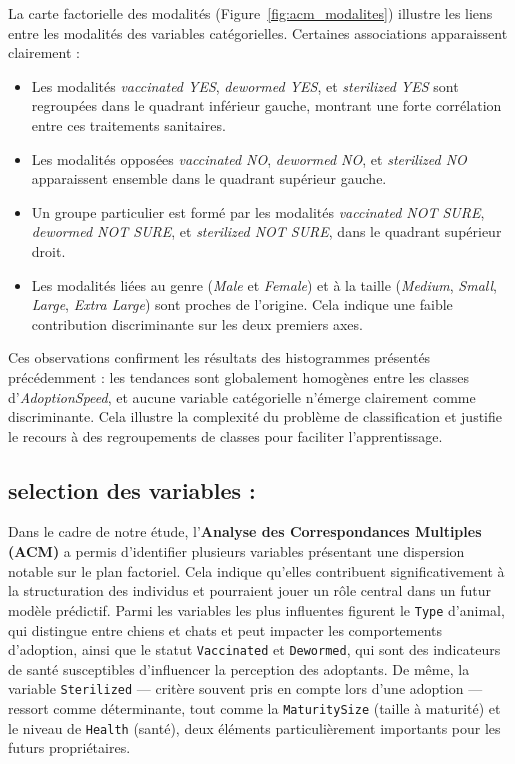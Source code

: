 \documentclass[a4paper,12pt]{article}
\begin{document}
La carte factorielle des modalités (Figure~\ref{fig:acm_modalites}) illustre les liens entre les modalités des variables catégorielles. Certaines associations apparaissent clairement :
 
\begin{itemize}

    \item Les modalités \textit{vaccinated YES}, \textit{dewormed YES}, et \textit{sterilized YES} sont regroupées dans le quadrant inférieur gauche, montrant une forte corrélation entre ces traitements sanitaires.

    \item Les modalités opposées \textit{vaccinated NO}, \textit{dewormed NO}, et \textit{sterilized NO} apparaissent ensemble dans le quadrant supérieur gauche.

    \item Un groupe particulier est formé par les modalités \textit{vaccinated NOT SURE}, \textit{dewormed NOT SURE}, et \textit{sterilized NOT SURE}, dans le quadrant supérieur droit.

    \item Les modalités liées au genre (\textit{Male} et \textit{Female}) et à la taille (\textit{Medium}, \textit{Small}, \textit{Large}, \textit{Extra Large}) sont proches de l’origine. Cela indique une faible contribution discriminante sur les deux premiers axes.

\end{itemize}
 
Ces observations confirment les résultats des histogrammes présentés précédemment : les tendances sont globalement homogènes entre les classes d’\textit{AdoptionSpeed}, et aucune variable catégorielle n’émerge clairement comme discriminante. Cela illustre la complexité du problème de classification et justifie le recours à des regroupements de classes pour faciliter l’apprentissage.
 
 
\subsection{selection des variables :}
 
Dans le cadre de notre étude, l'\textbf{Analyse des Correspondances Multiples (ACM)} a permis d’identifier plusieurs variables présentant une dispersion notable sur le plan factoriel. Cela indique qu’elles contribuent significativement à la structuration des individus et pourraient jouer un rôle central dans un futur modèle prédictif. Parmi les variables les plus influentes figurent le \texttt{Type} d’animal, qui distingue entre chiens et chats et peut impacter les comportements d’adoption, ainsi que le statut \texttt{Vaccinated} et \texttt{Dewormed}, qui sont des indicateurs de santé susceptibles d’influencer la perception des adoptants. De même, la variable \texttt{Sterilized} --- critère souvent pris en compte lors d’une adoption --- ressort comme déterminante, tout comme la \texttt{MaturitySize} (taille à maturité) et le niveau de \texttt{Health} (santé), deux éléments particulièrement importants pour les futurs propriétaires.
 
\end{document}
